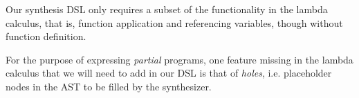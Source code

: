 \documentclass{article}
\begin{document}

Our synthesis DSL
only requires a subset of the functionality in the lambda calculus,
that is, function application and referencing variables,
though without function definition.

For the purpose of expressing \emph{partial} programs,
one feature missing in the lambda calculus that we will need to add in our DSL is that of \emph{holes},
i.e. placeholder nodes in the AST to be filled by the synthesizer.

\end{document}
